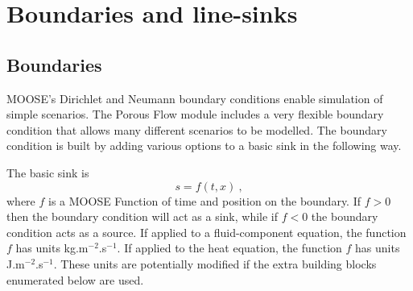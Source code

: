 \documentclass[12pt]{report}
\begin{document}





\chapter{Boundaries and line-sinks}

\section{Boundaries}

MOOSE's Dirichlet and Neumann boundary conditions enable simulation of
simple scenarios.  The Porous Flow module includes a very flexible
boundary condition that allows many different scenarios to be
modelled.  The boundary condition is built by adding various options
to a basic sink in the following way.

The basic sink is
\begin{equation}
s = f(t, x) \ ,
\end{equation}
where $f$ is a MOOSE Function of time and position on the boundary.
If $f>0$ then the boundary condition will act as a sink, while if
$f<0$ the boundary condition acts as a source.  If applied to a
fluid-component equation, the function $f$ has units
kg.m$^{-2}$.s$^{-1}$.  If applied to the heat equation, the function
$f$ has units J.m$^{-2}$.s$^{-1}$.  These units are potentially
modified if the extra building blocks enumerated below are used.
\end{document}
